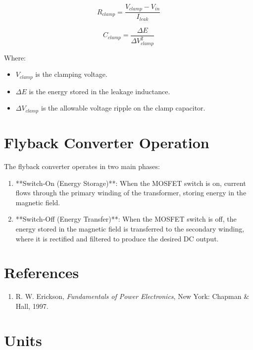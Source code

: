 \documentclass{article}
\begin{document}
\[
R_{clamp} = \frac{V_{clamp} - V_{in}}{I_{leak}}
\]

\[
C_{clamp} = \frac{\Delta E}{\Delta V_{clamp}^2}
\]

Where:
\begin{itemize}
    \item $V_{clamp}$ is the clamping voltage.
    \item $\Delta E$ is the energy stored in the leakage inductance.
    \item $\Delta V_{clamp}$ is the allowable voltage ripple on the clamp capacitor.
\end{itemize}

\section{Flyback Converter Operation}
The flyback converter operates in two main phases:
\begin{enumerate}
    \item **Switch-On (Energy Storage)**: When the MOSFET switch is on, current flows through the primary winding of the transformer, storing energy in the magnetic field.
    \item **Switch-Off (Energy Transfer)**: When the MOSFET switch is off, the energy stored in the magnetic field is transferred to the secondary winding, where it is rectified and filtered to produce the desired DC output.
\end{enumerate}

\section{References}

\begin{enumerate}
    \item R. W. Erickson, \textit{Fundamentals of Power Electronics}, New York: Chapman \& Hall, 1997.
\end{enumerate}

\section{Units}
\end{document}
